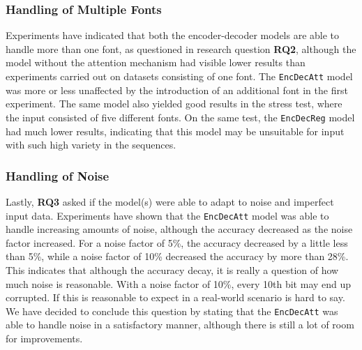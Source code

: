 \subsubsection{Handling of Multiple Fonts}
Experiments have indicated that both the encoder-decoder models are able to handle more than one font, as questioned in research question \textbf{RQ2}, although the model without the attention mechanism had visible lower results than experiments carried out on datasets consisting of one font. The {\tt EncDecAtt} model was more or less unaffected by the introduction of an additional font in the first experiment. The same model also yielded good results in the stress test, where the input consisted of five different fonts. On the same test, the {\tt EncDecReg} model had much lower results, indicating that this model may be unsuitable for input with such high variety in the sequences.

\subsubsection{Handling of Noise}
Lastly, \textbf{RQ3} asked if the model(s) were able to adapt to noise and imperfect input data. Experiments have shown that the {\tt EncDecAtt} model was able to handle increasing amounts of noise, although the accuracy decreased as the noise factor increased. For a noise factor of 5\%, the accuracy decreased by a little less than 5\%, while a noise factor of 10\% decreased the accuracy by more than 28\%. This indicates that although the accuracy decay, it is really a question of how much noise is reasonable. With a noise factor of 10\%, every 10th bit may end up corrupted. If this is reasonable to expect in a real-world scenario is hard to say. We have decided to conclude this question by stating that the {\tt EncDecAtt} was able to handle noise in a satisfactory manner, although there is still a lot of room for improvements.